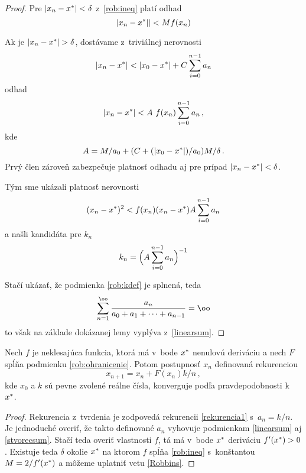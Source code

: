 \begin{proof}
Pre $\lvert x_n - x^\ast\rvert < \delta$ z~\eqref{rob:ineq} platí odhad
\[\lvert x_n - x^\ast\rvert\rvert < Mf(x_n)\]

Ak je $\lvert x_n - x^\ast \rvert > \delta$, dostávame z~triviálnej nerovnosti
\[\lvert x_n - x^\ast\rvert < \lvert x_0-x^\ast\rvert + C \sum_{i=0}^{n-1} a_n\]
odhad
\[\lvert x_n - x^\ast\rvert < A~f(x_n)\sum_{i=0}^{n-1}a_n\,,\]
kde
\[A =M/a_0 + (C + (\lvert x_0-x^\ast\rvert)/a_0) M/\delta\,.\]
Prvý člen zároveň zabezpečuje platnosť odhadu aj pre prípad
$\lvert x_n - x^\ast\rvert < \delta$.

Tým sme ukázali platnosť nerovnosti
\[(x_n-x^\ast)^2 <  f(x_n)(x_n-x^\ast)A\sum_{i=0}^{n-1}a_n\]
a našli kandidáta pre $k_n$
\[k_n = \Bigl(A\sum_{i=0}^{n-1}a_n\Bigr)^{-1}\]

Stačí ukázať, že podmienka \eqref{rob:kdef} je splnená, teda
\[\sum_{n=1}^\oo \frac{a_n}{a_0+a_1+\dots+a_{n-1}} = \oo \]
to však na základe dokázanej lemy vyplýva z~\eqref{linearsum}.
\end{proof}
\begin{dosledok}
Nech $f$ je neklesajúca funkcia, ktorá má v~bode $x^\ast$ nenulovú
deriváciu a nech $F$ spĺňa podmienku \eqref{rob:ohranicenie}. Potom postupnosť
$x_n$ definovaná rekurenciou 
\[x_{n+1} = x_{n} + F(x_{n})k/n\,,\label{rob:commonform}\]
kde $x_0$ a $k$ sú pevne zvolené reálne čísla, konverguje podľa
pravdepodobnosti k~$x^\ast$.
\end{dosledok}
\begin{proof}
Rekurencia z~tvrdenia je zodpovedá rekurencii \eqref{rekurencia1} s~$a_n=k/n$.
Je jednoduché overiť, že takto definované $a_n$ vyhovuje podmienkam
\eqref{linearsum} aj \eqref{stvorecsum}. Stačí teda overiť vlastnosti $f$, tá má
v~bode $x^\ast$ deriváciu $f'(x^\ast) > 0$. Existuje teda $\delta$ okolie
$x^\ast$ na ktorom $f$ spĺňa \eqref{rob:ineq} s~konštantou $M=2/f'(x^\ast)$ a môžeme
uplatniť vetu \ref{Robbins}.
\end{proof}
